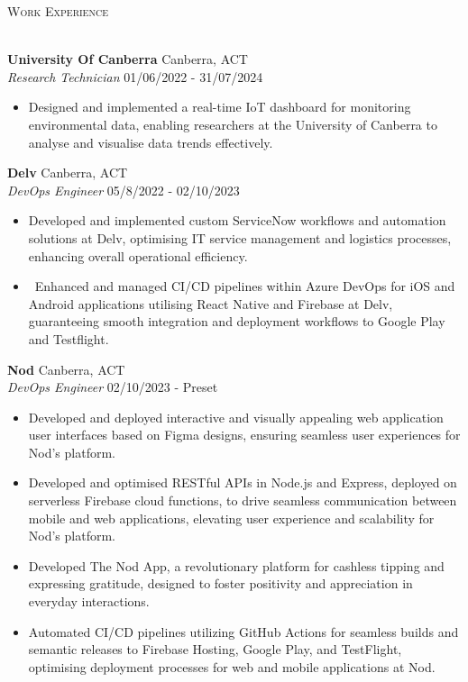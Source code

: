 \documentclass[a4paper]{article}
\newcommand{\lineunder} {
    \vspace*{-8pt} \\
    \hspace*{-18pt} \hrulefill \\
}
\newcommand{\header} [1] {
    {\hspace*{-18pt}\vspace*{6pt} \textsc{#1}}
    \vspace*{-6pt} \lineunder
}
\begin{document}
      \header{Work Experience}
      \vspace{1mm}

      \textbf{University Of Canberra} \hfill Canberra, ACT\\
          \textit{Research Technician} \hfill 01/06/2022 - 31/07/2024\\
          \vspace{-1mm}
\begin{itemize} \itemsep 1pt
      \item Designed and implemented a real-time IoT dashboard for monitoring environmental data, enabling researchers at the University of Canberra to analyse and visualise data trends effectively.
\end{itemize}
      \textbf{Delv} \hfill Canberra, ACT\\
          \textit{DevOps Engineer} \hfill 05/8/2022 - 02/10/2023\\
          \vspace{-1mm}
      \begin{itemize} \itemsep 1pt
            \item Developed and implemented custom ServiceNow workflows and automation solutions at Delv, optimising IT service management and logistics processes, enhancing overall operational efficiency.
            \item {\
}Enhanced and managed CI/CD pipelines within Azure DevOps for iOS and Android applications utilising React Native and Firebase at Delv, guaranteeing smooth integration and deployment workflows to Google Play and Testflight.
      \end{itemize}
      \textbf{Nod} \hfill Canberra, ACT\\
          \textit{DevOps Engineer} \hfill 02/10/2023 - Preset\\
          \vspace{-1mm}
\begin{itemize} \itemsep 1pt
      \item Developed and deployed interactive and visually appealing web application user interfaces based on Figma designs, ensuring seamless user experiences for Nod's platform.
      \item Developed and optimised RESTful APIs in Node.js and Express, deployed on serverless Firebase cloud functions, to drive seamless communication between mobile and web applications, elevating user experience and scalability for Nod's platform.
      \item Developed The Nod App, a revolutionary platform for cashless tipping and expressing gratitude, designed to foster positivity and appreciation in everyday interactions.
      \item Automated CI/CD pipelines utilizing GitHub Actions for seamless builds and semantic releases to Firebase Hosting, Google Play, and TestFlight, optimising deployment processes for web and mobile applications at Nod.
\end{itemize}
\end{document}
